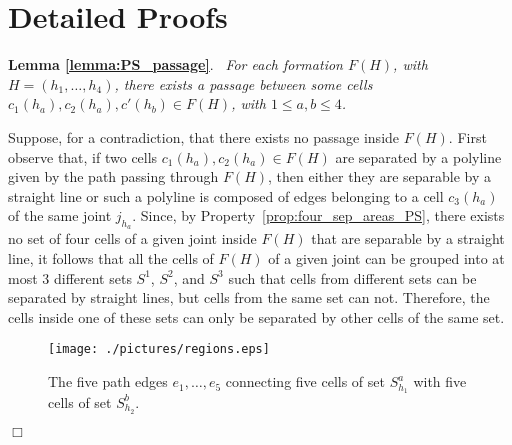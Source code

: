 \documentclass[a4paper,10pt]{llncs}
\newcounter{prop}
\renewenvironment{proof}
{{\bf Proof:}}{\hspace*{\fill}$\Box$\par\vspace{2mm}}
\newcommand{\rephrase}[3]{\noindent\textbf{#1 #2}.~\emph{#3}}
\begin{document}
\section{Detailed Proofs}\label{se:proofs}

\rephrase{Lemma}{\ref{lemma:PS_passage}}{
For each formation $F(H)$, with $H=(h_1, \ldots ,h_4)$, there exists a passage between some cells $c_1(h_a),c_2(h_a),c'(h_b) \in F(H)$, with $1 \leq a,b \leq 4$.
}

\begin{proof}
Suppose, for a contradiction, that there exists no passage inside $F(H)$. First observe that, if two cells $c_1(h_a),c_2(h_a) \in F(H)$ are separated by a polyline given by the path passing through $F(H)$, then either they are separable by a straight line or such a polyline is composed of edges belonging to a cell $c_3(h_a)$ of the same joint $j_{h_a}$. Since, by Property~\ref{prop:four_sep_areas_PS}, there exists no set of four cells of a given joint inside $F(H)$ that are separable by a straight line, it follows that all the cells of $F(H)$ of a given joint can be grouped into at most $3$ different sets $S^1$, $S^2$, and $S^3$ such that cells from different sets can be separated by straight lines, but cells from the same set can not. Therefore, the cells inside one of these sets can only be separated by other cells of the same set.

\begin{figure}[ht]
\begin{center}
\texttt{[image: ./pictures/regions.eps]}
\caption{The five path edges $e_1,\ldots ,e_5$ connecting five cells of set $S_{h_1}^a$ with five cells of set $S_{h_2}^b$.}
\label{fig:regions}
\end{center}
\end{figure}


\end{proof}
\end{document}
